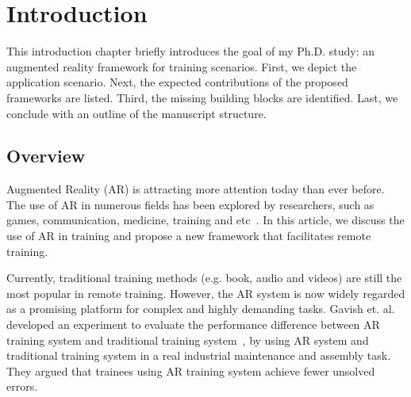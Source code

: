 \chapter{Introduction}
\label{cha:i}

This introduction chapter briefly introduces the goal of my Ph.D. study: an augmented reality framework for training scenarios.
First, we depict the application scenario.
Next, the expected contributions of the proposed frameworks are listed.
Third, the missing building blocks are identified.
Last, we conclude with an outline of the manuscript structure.

\section{Overview}
\label{sec:i:ov}

Augmented Reality (AR) is attracting more attention today than ever before. The use of AR in numerous fields has been explored by researchers, such as games, communication, medicine, training and etc~\cite{nakajima2003,gonzalez-franco2016,hincapie2011,webel2011}.
In this article, we discuss the use of AR in training and propose a new framework that facilitates remote training.

Currently, traditional training methods (e.g. book, audio and videos) are still the most popular in remote training. However, the AR system is now widely regarded as a promising platform for complex and highly demanding tasks.
Gavish et. al. developed an experiment to evaluate the performance difference between AR training system and traditional training system~\cite{gavish2015}, by using AR system and traditional training system in a real industrial maintenance and assembly task. They argued that trainees using AR training system achieve fewer unsolved errors.


